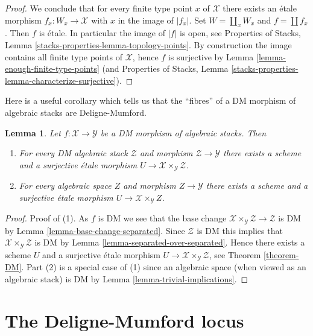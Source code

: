 \documentclass{stacks-project}
\theoremstyle{plain}
\newtheorem{lemma}[subsection]{Lemma}
\theoremstyle{definition}
\theoremstyle{remark}
\numberwithin{equation}{subsection}
\begin{document}
\begin{proof}
\medskip\noindent
We conclude that for every finite type point $x$ of $\mathcal{X}$ there
exists an \'etale morphism $f_x : W_x \to \mathcal{X}$ with $x$ in the
image of $|f_x|$. Set $W = \coprod_x W_x$ and $f = \coprod f_x$. Then $f$
is \'etale. In particular the image of $|f|$ is open, see
Properties of Stacks, Lemma \ref{stacks-properties-lemma-topology-points}.
By construction the image contains all finite type points of $\mathcal{X}$,
hence $f$ is surjective by
Lemma \ref{lemma-enough-finite-type-points} (and
Properties of Stacks, Lemma
\ref{stacks-properties-lemma-characterize-surjective}).
\end{proof}

\noindent
Here is a useful corollary which tells us that the ``fibres'' of
a DM morphism of algebraic stacks are Deligne-Mumford.

\begin{lemma}
\label{lemma-DM}
Let $f : \mathcal{X} \to \mathcal{Y}$ be a DM morphism of algebraic
stacks. Then
\begin{enumerate}
\item For every DM algebraic stack $\mathcal{Z}$ and morphism
$\mathcal{Z} \to \mathcal{Y}$ there exists a scheme and
a surjective \'etale morphism
$U \to \mathcal{X} \times_\mathcal{Y} \mathcal{Z}$.
\item For every algebraic space $Z$ and morphism
$Z \to \mathcal{Y}$ there exists a scheme and
a surjective \'etale morphism
$U \to \mathcal{X} \times_\mathcal{Y} Z$.
\end{enumerate}
\end{lemma}

\begin{proof}
Proof of (1). As $f$ is DM we see that the base change
$\mathcal{X} \times_\mathcal{Y} \mathcal{Z} \to \mathcal{Z}$ is DM
by Lemma \ref{lemma-base-change-separated}.
Since $\mathcal{Z}$ is DM this implies that
$\mathcal{X} \times_\mathcal{Y} \mathcal{Z}$ is DM
by Lemma \ref{lemma-separated-over-separated}. Hence there exists a
scheme $U$ and a surjective \'etale morphism
$U \to \mathcal{X} \times_\mathcal{Y} \mathcal{Z}$, see
Theorem \ref{theorem-DM}.
Part (2) is a special case of (1) since an algebraic space
(when viewed as an algebraic stack) is DM by
Lemma \ref{lemma-trivial-implications}.
\end{proof}






\section{The Deligne-Mumford locus}
\label{section-DM}
\end{document}
